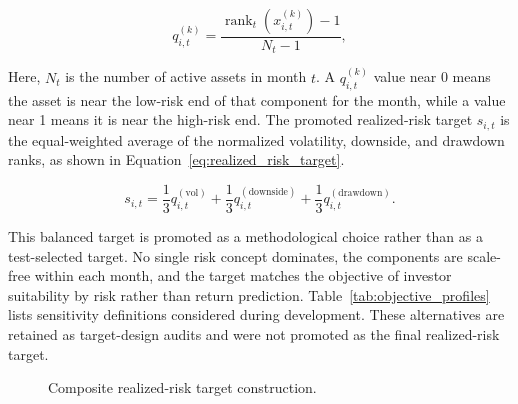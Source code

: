 \begin{equation}
q_{i,t}^{(k)} =
\frac{\operatorname{rank}_{t}(x_{i,t}^{(k)}) - 1}{N_t - 1},
\label{eq:component_rank}
\end{equation}

Here, \(N_t\) is the number of active assets in month \(t\). A \(q_{i,t}^{(k)}\) value near 0 means the asset is near the low-risk end of that component for the month, while a value near 1 means it is near the high-risk end. The promoted realized-risk target \(s_{i,t}\) is the equal-weighted average of the normalized volatility, downside, and drawdown ranks, as shown in Equation~\ref{eq:realized_risk_target}.

\begin{equation}
s_{i,t} =
\frac{1}{3}q_{i,t}^{(\mathrm{vol})}
+ \frac{1}{3}q_{i,t}^{(\mathrm{downside})}
+ \frac{1}{3}q_{i,t}^{(\mathrm{drawdown})}.
\label{eq:realized_risk_target}
\end{equation}

This balanced target is promoted as a methodological choice rather than as a test-selected target. No single risk concept dominates, the components are scale-free within each month, and the target matches the objective of investor suitability by risk rather than return prediction. Table~\ref{tab:objective_profiles} lists sensitivity definitions considered during development. These alternatives are retained as target-design audits and were not promoted as the final realized-risk target.

\begin{figure}[H]
\centering
{}
\caption{Composite realized-risk target construction.}
\label{fig:composite_risk_target}
\end{figure}

